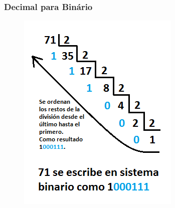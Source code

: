 \documentclass[10pt]{beamer}
\begin{document}
\begin{frame}[fragile]

\frametitle{Decimal para Binário}

\begin{figure}[!ht]
\centering
\includegraphics[height =.65\textheight,width=.8\textwidth]
{figuras/decimal_binario.png}
\end{figure}

\end{frame}
\end{document}
